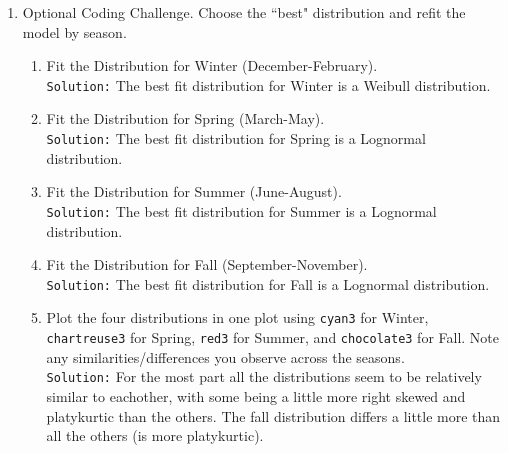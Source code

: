\documentclass{article}\usepackage[]{graphicx}\usepackage[]{xcolor}
\begin{document}
\begin{enumerate}
  \item Optional Coding Challenge. Choose the ``best" distribution and refit the
  model by season.
  \begin{enumerate}
    \item Fit the Distribution for Winter (December-February).\\
    \texttt{Solution:} The best fit distribution for Winter is a Weibull distribution.
    \item Fit the Distribution for Spring (March-May).\\
    \texttt{Solution:} The best fit distribution for Spring is a Lognormal distribution.
    \item Fit the Distribution for Summer (June-August).\\
    \texttt{Solution:} The best fit distribution for Summer is a Lognormal distribution.
    \item Fit the Distribution for Fall (September-November).\\
    \texttt{Solution:} The best fit distribution for Fall is a Lognormal distribution.
    \item Plot the four distributions in one plot using \texttt{cyan3} for Winter,
    \texttt{chartreuse3} for Spring, \texttt{red3} for Summer, and \texttt{chocolate3}
    for Fall. Note any similarities/differences you observe across the seasons. \\
    \texttt{Solution:} For the most part all the distributions seem to be relatively similar to eachother, with some being a little more right skewed and platykurtic than the others. The fall distribution differs a little more than all the others (is more platykurtic).
  \end{enumerate}
\end{enumerate}
\end{document}
